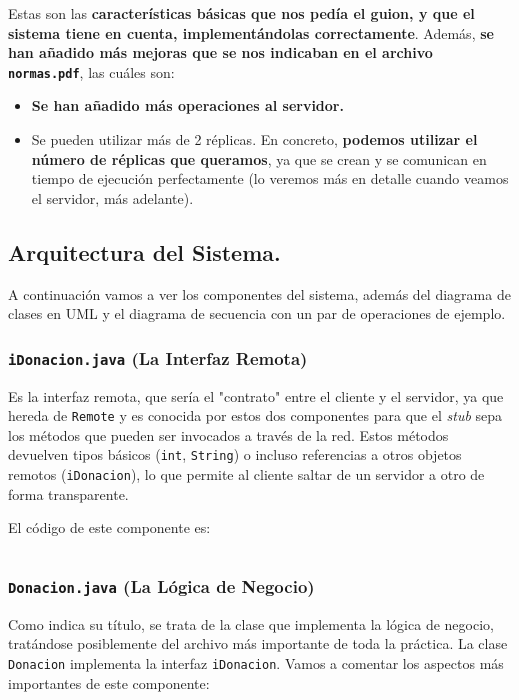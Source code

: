 \documentclass[a4paper,12pt]{article}
\begin{document}
			Estas son las \textbf{características básicas que nos pedía el guion, y que el sistema tiene en cuenta, implementándolas correctamente}. Además,\textbf{ se han añadido más mejoras que se nos indicaban en el archivo \texttt{normas.pdf}}, las cuáles son:
			\begin{itemize}
				\item \textbf{Se han añadido más operaciones al servidor.}
				\item Se pueden utilizar más de 2 réplicas. En concreto, \textbf{podemos utilizar el número de réplicas que queramos}, ya que se crean y se comunican en tiempo de ejecución perfectamente (lo veremos más en detalle cuando veamos el servidor, más adelante). 
			\end{itemize} 
		 
		
		\subsection{Arquitectura del Sistema.}
			A continuación vamos a ver los componentes del sistema, además del diagrama de clases en UML y el diagrama de secuencia con un par de operaciones de ejemplo.
			
			\subsubsection{\texttt{iDonacion.java} (La Interfaz Remota)}
				Es la interfaz remota, que sería el "contrato" entre el cliente y el servidor, ya que hereda de \texttt{Remote}  y es conocida por estos dos componentes para que el \textit{stub} sepa los métodos que pueden ser invocados a través de la red. Estos métodos devuelven tipos básicos (\texttt{int}, \texttt{String}) o incluso referencias a otros objetos remotos (\texttt{iDonacion}), lo que permite al cliente saltar de un servidor a otro de forma transparente.
				
				El código de este componente es:
				
				\inputminted[linenos, frame=lines, fontsize=\scriptsize]{Java}{../codigo/Parte_2_Servidor_Replicado/iDonacion.java}
				
			\subsubsection{\texttt{Donacion.java} (La Lógica de Negocio)}
				Como indica su título, se trata de la clase que implementa la lógica de negocio, tratándose posiblemente del archivo más importante de toda la práctica. La clase \texttt{Donacion} implementa la interfaz \texttt{iDonacion}. Vamos a comentar los aspectos más importantes de este componente:
				
\end{document}
